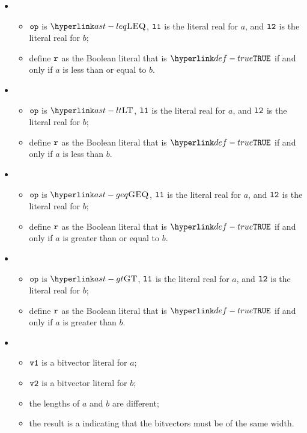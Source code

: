 \begin{itemize}
  \item {}
  \begin{itemize}
    \item $\texttt{op}$ is $\LEQ$, $\texttt{l1}$ is the literal real for $a$, and $\texttt{l2}$ is the literal real for $b$;
    \item define $\texttt{r}$ as the Boolean literal that is $\True$ if and only if $a$ is less than or equal to $b$.
  \end{itemize}

  \item {}
  \begin{itemize}
    \item $\texttt{op}$ is $\LT$, $\texttt{l1}$ is the literal real for $a$, and $\texttt{l2}$ is the literal real for $b$;
    \item define $\texttt{r}$ as the Boolean literal that is $\True$ if and only if $a$ is less than $b$.
  \end{itemize}

  \item {}
  \begin{itemize}
    \item $\texttt{op}$ is $\GEQ$, $\texttt{l1}$ is the literal real for $a$, and $\texttt{l2}$ is the literal real for $b$;
    \item define $\texttt{r}$ as the Boolean literal that is $\True$ if and only if $a$ is greater than or equal to $b$.
  \end{itemize}

  \item {}
  \begin{itemize}
    \item $\texttt{op}$ is $\GT$, $\texttt{l1}$ is the literal real for $a$, and $\texttt{l2}$ is the literal real for $b$;
    \item define $\texttt{r}$ as the Boolean literal that is $\True$ if and only if $a$ is greater than $b$.
  \end{itemize}

  \item {}
  \begin{itemize}
    \item $\texttt{v1}$ is a bitvector literal for $a$;
    \item $\texttt{v2}$ is a bitvector literal for $b$;
    \item the lengths of $a$ and $b$ are different;
    \item the result is a \typingerrorterm{} indicating that the bitvectors must be of the same width.
  \end{itemize}


\end{itemize}
